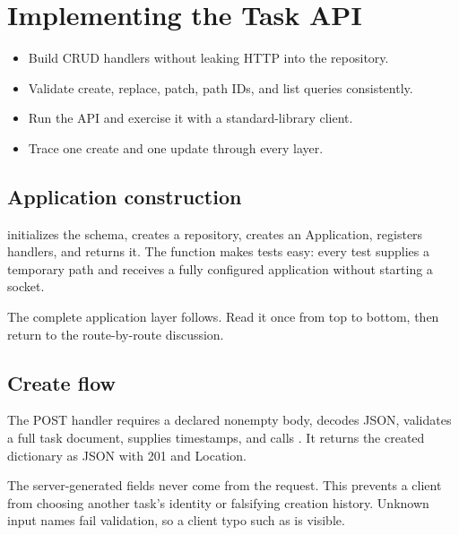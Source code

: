 \chapter{Implementing the Task API}

\begin{objectives}
\begin{itemize}
  \item Build CRUD handlers without leaking HTTP into the repository.
  \item Validate create, replace, patch, path IDs, and list queries consistently.
  \item Run the API and exercise it with a standard-library client.
  \item Trace one create and one update through every layer.
\end{itemize}
\end{objectives}

\section{Application construction}

 initializes the schema, creates a repository,
creates an Application, registers handlers, and returns it. The function makes
tests easy: every test supplies a temporary path and receives a fully configured
application without starting a socket.

The complete application layer follows. Read it once from top to bottom, then
return to the route-by-route discussion.


\section{Create flow}

The POST handler requires a declared nonempty body, decodes JSON, validates a
full task document, supplies timestamps, and calls .
It returns the created dictionary as JSON with 201 and Location.

The server-generated fields never come from the request. This prevents a client
from choosing another task's identity or falsifying creation history. Unknown
input names fail validation, so a client typo such as  is visible.

